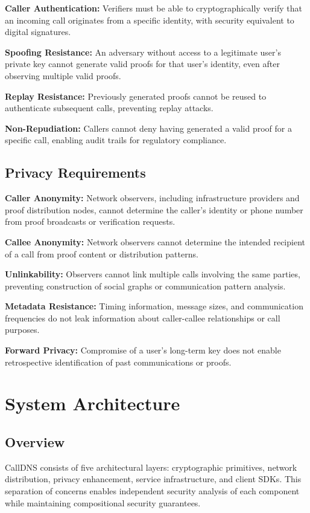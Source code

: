 \documentclass[11pt,twocolumn]{article}
\begin{document}
\textbf{Caller Authentication:} Verifiers must be able to cryptographically verify that an incoming call originates from a specific identity, with security equivalent to digital signatures.

\textbf{Spoofing Resistance:} An adversary without access to a legitimate user's private key cannot generate valid proofs for that user's identity, even after observing multiple valid proofs.

\textbf{Replay Resistance:} Previously generated proofs cannot be reused to authenticate subsequent calls, preventing replay attacks.

\textbf{Non-Repudiation:} Callers cannot deny having generated a valid proof for a specific call, enabling audit trails for regulatory compliance.

\subsection{Privacy Requirements}

\textbf{Caller Anonymity:} Network observers, including infrastructure providers and proof distribution nodes, cannot determine the caller's identity or phone number from proof broadcasts or verification requests.

\textbf{Callee Anonymity:} Network observers cannot determine the intended recipient of a call from proof content or distribution patterns.

\textbf{Unlinkability:} Observers cannot link multiple calls involving the same parties, preventing construction of social graphs or communication pattern analysis.

\textbf{Metadata Resistance:} Timing information, message sizes, and communication frequencies do not leak information about caller-callee relationships or call purposes.

\textbf{Forward Privacy:} Compromise of a user's long-term key does not enable retrospective identification of past communications or proofs.

\section{System Architecture}

\subsection{Overview}

CallDNS consists of five architectural layers: cryptographic primitives, network distribution, privacy enhancement, service infrastructure, and client SDKs. This separation of concerns enables independent security analysis of each component while maintaining compositional security guarantees.
\end{document}
